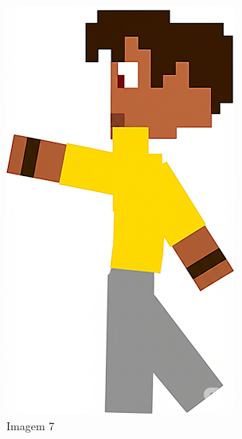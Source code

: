 \begin{figure}[htbp]
\begin{subfigure}{0.23\linewidth}
        \includegraphics[width=1\linewidth]{figs/geminiPro/chat10/tela1_res2_7.PNG}
        \caption{\small Imagem 7}
        \label{fig:geminiProSheet5_2g}
    \end{subfigure}
    \begin{subfigure}{0.23\linewidth}

\end{subfigure}
\end{figure}
